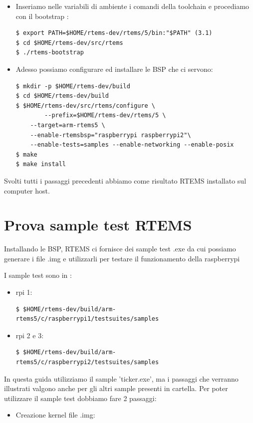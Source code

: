 \documentclass[12pt, a4paper]{article}
\begin{document}
\begin{flushleft}
\begin{itemize}
\item Inseriamo nelle variabili di ambiente i comandi della toolchain e procediamo con il bootstrap : 
\begin{lstlisting}[style=BashStyle] 
$ export PATH=$HOME/rtems-dev/rtems/5/bin:"$PATH" (3.1)
$ cd $HOME/rtems-dev/src/rtems
$ ./rtems-bootstrap
\end{lstlisting}	
	
\item Adesso possiamo configurare ed installare le BSP che ci servono: 
\begin{lstlisting}[style=BashStyle] 
$ mkdir -p $HOME/rtems-dev/build
$ cd $HOME/rtems-dev/build
$ $HOME/rtems-dev/src/rtems/configure \
        --prefix=$HOME/rtems-dev/rtems/5 \
	--target=arm-rtems5 \
	--enable-rtemsbsp="raspberrypi raspberrypi2"\
	--enable-tests=samples --enable-networking --enable-posix
$ make
$ make install	
\end{lstlisting}
		
\end{itemize}

Svolti tutti i passaggi precedenti abbiamo come risultato RTEMS installato sul computer host.
\newpage
\section{Prova sample test RTEMS}

Installando le BSP, RTEMS ci fornisce dei sample test .exe da cui possiamo generare i file .img e utilizzarli per testare il funzionamento della raspberrypi

I sample test sono in : 
\begin{itemize}
\item  rpi 1:
\begin{lstlisting}[style=BashStyle] 
$ $HOME/rtems-dev/build/arm-rtems5/c/raspberrypi1/testsuites/samples
\end{lstlisting}
\item  rpi 2 e 3:
\begin{lstlisting}[style=BashStyle] 
$ $HOME/rtems-dev/build/arm-rtems5/c/raspberrypi2/testsuites/samples
\end{lstlisting}
\end{itemize}

In questa guida utilizziamo il sample 'ticker.exe', ma i passaggi che verranno illustrati valgono anche per gli altri sample presenti in cartella.
Per poter utilizzare il sample test dobbiamo fare 2 passaggi:
\begin{itemize}
\item Creazione kernel file .img:


\end{itemize}
\end{flushleft}
\end{document}
